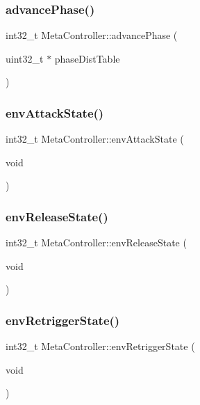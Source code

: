 \subsubsection{\texorpdfstring{advance\+Phase()}{advancePhase()}}
{\footnotesize\ttfamily int32\+\_\+t Meta\+Controller\+::advance\+Phase (\begin{DoxyParamCaption}\item[{uint32\+\_\+t $\ast$}]{phase\+Dist\+Table }\end{DoxyParamCaption})}

\mbox{\label{class_meta_controller_afd3d1fbf5121b09b014fa6b64468c78c}} 
\subsubsection{\texorpdfstring{env\+Attack\+State()}{envAttackState()}}
{\footnotesize\ttfamily int32\+\_\+t Meta\+Controller\+::env\+Attack\+State (\begin{DoxyParamCaption}\item[{void}]{ }\end{DoxyParamCaption})}

\mbox{\label{class_meta_controller_a2025aa7292568159bc5e4708d305b62a}} 
\subsubsection{\texorpdfstring{env\+Release\+State()}{envReleaseState()}}
{\footnotesize\ttfamily int32\+\_\+t Meta\+Controller\+::env\+Release\+State (\begin{DoxyParamCaption}\item[{void}]{ }\end{DoxyParamCaption})}

\mbox{\label{class_meta_controller_ad96c9b0dd76428cbbf4cc7e578a69319}} 
\subsubsection{\texorpdfstring{env\+Retrigger\+State()}{envRetriggerState()}}
{\footnotesize\ttfamily int32\+\_\+t Meta\+Controller\+::env\+Retrigger\+State (\begin{DoxyParamCaption}\item[{void}]{ }\end{DoxyParamCaption})}

